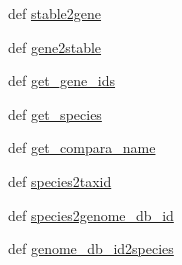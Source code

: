 \begin{DoxyCompactItemize}
def \hyperlink{namespaceel__utils_1_1ensembl_a2da33603fc25e6c44455446bb3f14550}{stable2gene}
\item 
def \hyperlink{namespaceel__utils_1_1ensembl_ade37528879f2f0b55b038e86a2dc7f38}{gene2stable}
\item 
def \hyperlink{namespaceel__utils_1_1ensembl_acf331d7b733f38411014df6b090ff9cb}{get\-\_\-gene\-\_\-ids}
\item 
def \hyperlink{namespaceel__utils_1_1ensembl_aee00e910eadafa065894d7d296de2272}{get\-\_\-species}
\item 
def \hyperlink{namespaceel__utils_1_1ensembl_a79999a873369b41eb3dc9bf1a0608606}{get\-\_\-compara\-\_\-name}
\item 
def \hyperlink{namespaceel__utils_1_1ensembl_adc07f8315d3cc44ad43f1bf6b76bed38}{species2taxid}
\item 
def \hyperlink{namespaceel__utils_1_1ensembl_a4b000fdd08b24e3f9c47eb03d4372d0a}{species2genome\-\_\-db\-\_\-id}
\item 
def \hyperlink{namespaceel__utils_1_1ensembl_ac4b940897c49d023e0d562b46e01d53c}{genome\-\_\-db\-\_\-id2species}
\end{DoxyCompactItemize}


